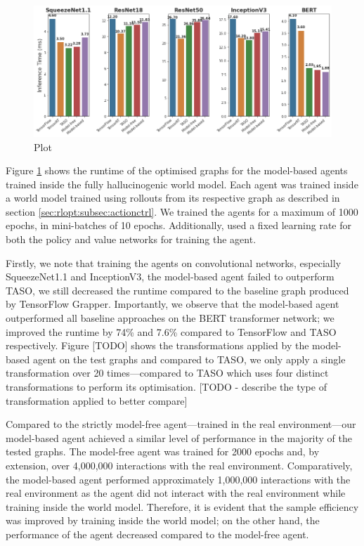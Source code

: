 \begin{figure}[ht]
  \centering
  \includegraphics[width=1\columnwidth]{sections/5evaluation/images/runtimes_all.png}
  \caption[Runtime of optimised graphs using model-based RL]{Plot}
  \label{fig:eval:world-model-runtimes}
\end{figure}

Figure \ref{fig:eval:world-model-runtimes} shows the runtime of the optimised graphs for the model-based agents trained inside the fully hallucinogenic world model. Each agent was trained inside a world model trained using rollouts from its respective graph as described in section \ref{sec:rlopt:subsec:actionctrl}. We trained the agents for a maximum of 1000 epochs, in mini-batches of 10 epochs. Additionally, used a fixed learning rate for both the policy and value networks for training the agent.

Firstly, we note that training the agents on convolutional networks, especially SqueezeNet1.1 and InceptionV3, the model-based agent failed to outperform TASO, we still decreased the runtime compared to the baseline graph produced by TensorFlow Grapper. Importantly, we observe that the model-based agent outperformed all baseline approaches on the BERT transformer network; we improved the runtime by 74\% and 7.6\% compared to TensorFlow and TASO respectively. Figure [TODO] shows the transformations applied by the model-based agent on the test graphs and compared to TASO, we only apply a single transformation over 20 times---compared to TASO which uses four distinct transformations to perform its optimisation. [TODO - describe the type of transformation applied to better compare]

Compared to the strictly model-free agent---trained in the real environment---our model-based agent achieved a similar level of performance in the majority of the tested graphs. The model-free agent was trained for 2000 epochs and, by extension, over 4,000,000 interactions with the real environment. Comparatively, the model-based agent performed approximately 1,000,000 interactions with the real environment as the agent did not interact with the real environment while training inside the world model. Therefore, it is evident that the sample efficiency was improved by training inside the world model; on the other hand, the performance of the agent decreased compared to the model-free agent.

